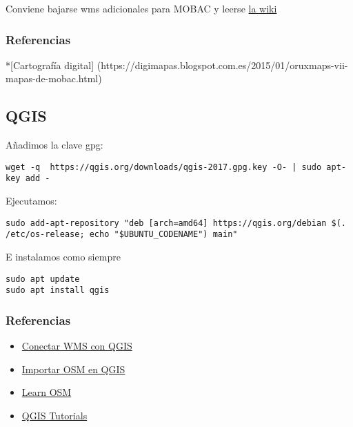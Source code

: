 \documentclass[
  12pt,
  spanish,
]{article}
\providecommand{\tightlist}{%
  \setlength{\itemsep}{0pt}\setlength{\parskip}{0pt}}
\begin{document}
Conviene bajarse wms adicionales para MOBAC y leerse
\href{http://mobac.sourceforge.net/wiki/index.php/Custom_XML_Map_Sources}{la
wiki}

\hypertarget{referencias-1}{%
\subsubsection{Referencias}\label{referencias-1}}

*{[}Cartografía digital{]}
(https://digimapas.blogspot.com.es/2015/01/oruxmaps-vii-mapas-de-mobac.html)

\hypertarget{qgis}{%
\subsection{QGIS}\label{qgis}}

Añadimos la clave gpg:

\begin{verbatim}
wget -q  https://qgis.org/downloads/qgis-2017.gpg.key -O- | sudo apt-key add -
\end{verbatim}

Ejecutamos:

\begin{verbatim}
sudo add-apt-repository "deb [arch=amd64] https://qgis.org/debian $(. /etc/os-release; echo "$UBUNTU_CODENAME") main"
\end{verbatim}

E instalamos como siempre

\begin{verbatim}
sudo apt update
sudo apt install qgis
\end{verbatim}

\hypertarget{referencias-2}{%
\subsubsection{Referencias}\label{referencias-2}}

\begin{itemize}
\tightlist
\item
  \href{https://mappinggis.com/2015/09/como-conectar-con-servicios-wms-y-wfs-con-arcgis-qgis-y-gvsig/}{Conectar
  WMS con QGIS}
\item
  \href{https://www.altergeosistemas.com/blog/2014/03/28/importando-datos-de-osm-en-qgis-2/}{Importar
  OSM en QGIS}
\item
  \href{http://learnosm.org/es/osm-data/osm-in-qgis/}{Learn OSM}
\item
  \href{http://www.qgistutorials.com/es/docs/downloading_osm_data.html}{QGIS
  Tutorials}
\end{itemize}
\end{document}
